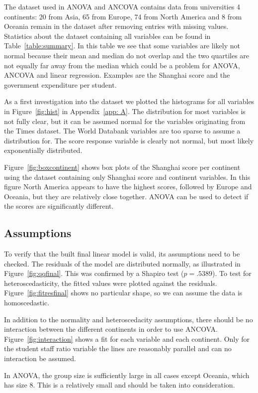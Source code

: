 \documentclass{stats_apa_style2}
\begin{document}
The dataset used in ANOVA and ANCOVA contains data
from universities 4 continents:
20 from Asia, 65 from Europe, 74 from North America and 8 from Oceania remain in
the dataset after removing entries with missing values. Statistics about the
dataset containing all variables can be found in Table~\ref{table:summary}. In
this table we see that some variables are likely not normal because their mean and median do not
overlap and the two quartiles are not equally far away from the median which
could be a problem for ANOVA, ANCOVA and linear regression.
Examples are the Shanghai score and the government expenditure per student.

As a first investigation into the dataset we plotted the histograms for all
variables in Figure~\ref{fig:hist} in Appendix~\ref{app: A}. The distribution for
most variables is not fully clear, but it can be assumed normal for the variables originating from the
Times dataset. The World Databank variables are too sparse to assume a
distribution for. The score response variable is clearly not normal, but most
likely exponentially distributed.

Figure~\ref{fig:boxcontinent} shows box plots of the Shanghai score per
continent using the dataset containing only Shanghai score and continent
variables.
In this figure North America appears to have the highest scores, followed by Europe and Oceania, but they are relatively close together. ANOVA
can be used to detect if the scores are significantly different. 

\subsection*{Assumptions}
To verify that the built final linear model is valid, its assumptions need to be
checked. The residuals
of the model are distributed normally, as illustrated in
Figure~\ref{fig:qqfinal}.
This was confirmed by a Shapiro test ($p=.5389$). To test for heteroscedasticity, the
fitted values were plotted against the residuals. Figure~\ref{fig:fitresfinal}
shows no particular shape, so we can assume the data is homoscedastic.

In addition to the normality and heteroscedacity assumptions, there should be no
interaction between the different continents in order to use ANCOVA.
Figure~\ref{fig:interaction} shows a fit for each variable and each continent.
Only for the student staff ratio variable the lines are reasonably parallel and
can no interaction be assumed.

In ANOVA, the group size is sufficiently large in all cases except Oceania,
which has size 8. This is a relatively small and should be taken into
consideration.
\end{document}
